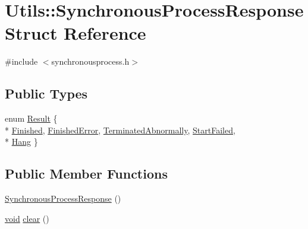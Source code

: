 \hypertarget{struct_utils_1_1_synchronous_process_response}{\section{Utils\-:\-:Synchronous\-Process\-Response Struct Reference}
\label{struct_utils_1_1_synchronous_process_response}
}


{\ttfamily \#include $<$synchronousprocess.\-h$>$}

\subsection*{Public Types}
\begin{DoxyCompactItemize}
\item 
enum \hyperlink{struct_utils_1_1_synchronous_process_response_aa7b2d882cf93d074f4392e57a6603f2c}{Result} \{ \\*
\hyperlink{struct_utils_1_1_synchronous_process_response_aa7b2d882cf93d074f4392e57a6603f2ca18d8397aeda3a545906837b296c1171a}{Finished}, 
\hyperlink{struct_utils_1_1_synchronous_process_response_aa7b2d882cf93d074f4392e57a6603f2ca244c73ca6d92e59323ceae0929e1bb90}{Finished\-Error}, 
\hyperlink{struct_utils_1_1_synchronous_process_response_aa7b2d882cf93d074f4392e57a6603f2ca08b186b062d11abc1b32a4a7542e8be5}{Terminated\-Abnormally}, 
\hyperlink{struct_utils_1_1_synchronous_process_response_aa7b2d882cf93d074f4392e57a6603f2cab7005460ed0d7509cc0217d23494e9ac}{Start\-Failed}, 
\\*
\hyperlink{struct_utils_1_1_synchronous_process_response_aa7b2d882cf93d074f4392e57a6603f2ca6d890cffeb6427f93f514581ff329247}{Hang}
 \}
\end{DoxyCompactItemize}
\subsection*{Public Member Functions}
\begin{DoxyCompactItemize}
\item 
\hyperlink{struct_utils_1_1_synchronous_process_response_a6b60ad7826c2dae839904a7e9af56c3b}{Synchronous\-Process\-Response} ()
\item 
\hyperlink{group___u_a_v_objects_plugin_ga444cf2ff3f0ecbe028adce838d373f5c}{void} \hyperlink{struct_utils_1_1_synchronous_process_response_aecd76e9c1f68cd239d60976036614924}{clear} ()
\end{DoxyCompactItemize}
